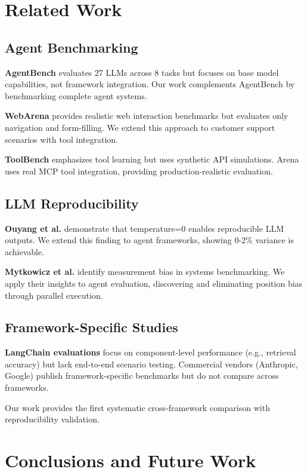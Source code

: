 \documentclass[sigconf,nonacm]{acmart}
\begin{document}
\section{Related Work}

\subsection{Agent Benchmarking}

\textbf{AgentBench} \cite{liu2023agentbench} evaluates 27 LLMs across 8 tasks but focuses on base model capabilities, not framework integration. Our work complements AgentBench by benchmarking complete agent systems.

\textbf{WebArena} \cite{zhou2023webarena} provides realistic web interaction benchmarks but evaluates only navigation and form-filling. We extend this approach to customer support scenarios with tool integration.

\textbf{ToolBench} \cite{qin2023toolllm} emphasizes tool learning but uses synthetic API simulations. Arena uses real MCP tool integration, providing production-realistic evaluation.

\subsection{LLM Reproducibility}

\textbf{Ouyang et al.} \cite{ouyang2023llm} demonstrate that temperature=0 enables reproducible LLM outputs. We extend this finding to agent frameworks, showing 0-2\% variance is achievable.

\textbf{Mytkowicz et al.} \cite{mytkowicz2009producing} identify measurement bias in systems benchmarking. We apply their insights to agent evaluation, discovering and eliminating position bias through parallel execution.

\subsection{Framework-Specific Studies}

\textbf{LangChain evaluations} focus on component-level performance (e.g., retrieval accuracy) but lack end-to-end scenario testing. Commercial vendors (Anthropic, Google) publish framework-specific benchmarks but do not compare across frameworks.

Our work provides the first systematic cross-framework comparison with reproducibility validation.

\section{Conclusions and Future Work}
\end{document}
